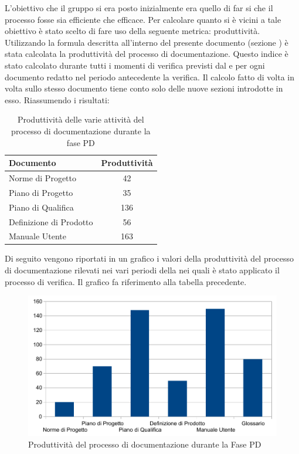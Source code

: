 				L'obiettivo che il gruppo si era posto inizialmente era quello di far si che il processo fosse sia efficiente che efficace. Per calcolare quanto si è vicini a tale obiettivo è stato scelto di fare uso della seguente metrica: produttività.\\
				Utilizzando la formula descritta all'interno del presente documento (sezione ) è stata calcolata la produttività del processo di documentazione. Questo indice è stato calcolato durante tutti i momenti di verifica previsti dal  e per ogni documento redatto nel periodo antecedente la verifica. Il calcolo fatto di volta in volta sullo stesso documento tiene conto solo delle nuove sezioni introdotte in esso. Riassumendo i risultati:
				\begin{table}[H]
			    	\centering
					\begin{tabu}{| l | c |}
						\hline
						Documento                 & Produttività   \\ \hline \hline
						Norme di Progetto	      & 42             \\ \hline
						Piano di Progetto	      & 35             \\ \hline
						Piano di Qualifica	      & 136            \\ \hline
						Definizione di Prodotto   & 56             \\ \hline
						Manuale Utente            & 163            \\ \hline
					\end{tabu}
					\caption{Produttività delle varie attività del processo di documentazione durante la fase PD}
				\end{table}
				Di seguito vengono riportati in un grafico i valori della produttività del processo di documentazione rilevati nei vari periodi della  nei quali è stato applicato il processo di verifica. Il grafico fa riferimento alla tabella precedente.
				\begin{figure}[H]
					\centering
					\includegraphics[width=12cm]{PianoDiQualifica/Pics/ProduttivitaDocumentazioneFasePD.pdf}
					\caption{Produttività del processo di documentazione durante la Fase PD}
				\end{figure}
